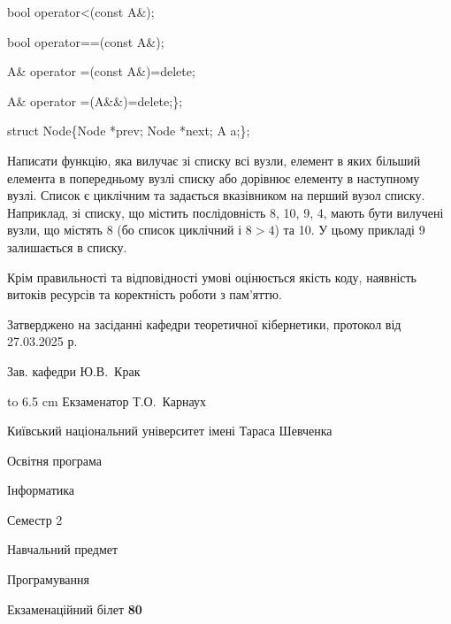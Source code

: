\documentclass[12pt, ukrainian]{article}
\begin{document}
{\quad  bool operator<(const A\&); 

\quad  bool operator==(const A\&); 

\quad A\& operator =(const A\&)=delete; 

\quad  A\& operator =(A\&\&)=delete;\};

struct Node\{Node *prev; Node *next; A a;\};

Написати функцію, яка вилучає зі списку всі вузли, елемент в яких більший елемента в попередньому вузлі списку або дорівнює елементу в наступному вузлі. Список є циклічним та задається вказівником на перший вузол списку. Наприклад, зі списку, що містить послідовність 8, 10, 9, 4, мають бути вилучені вузли, що містять 8 (бо список циклічний і $8>4$) та 10. У цьому прикладі 9 залишається в списку.

Крім правильності та відповідності умові оцінюється якість коду, наявність витоків ресурсів та коректність роботи з пам'яттю. 

}
{\smallskip\smallskip \begin {scriptsize} Затверджено на засіданні кафедри теоретичної кібернетики, протокол   від   27.03.2025 р.\par\smallskip\smallskip\smallskip\smallskip
{\parbox {6.5 cm} {Зав. кафедри \dotfill Ю.В.~Крак}}\hspace {0.7cm} {\hbox to 6.5 cm { Екзаменатор \dotfill Т.О.~Карнаух}} \end{scriptsize}}
\newpage
{{\begin {scriptsize}\par
{ \center  Київський національний університет імені Тараса Шевченка \par}
{\parbox {5 cm}{Освітня програма \hfill}{\parbox {7 cm}{Інформатика\hfill}}\parbox {6 cm}{\hfill Семестр 2}}\par
{\parbox {5 cm} {Навчальний предмет \hfill}\parbox {7 cm}{Програмування \hfill}\parbox {6cm}{\hfill}\par}\vspace{-15pt} \end{scriptsize}}{\center Екзаменаційний білет \No \textbf { 80 }\par}}
\end{document}
